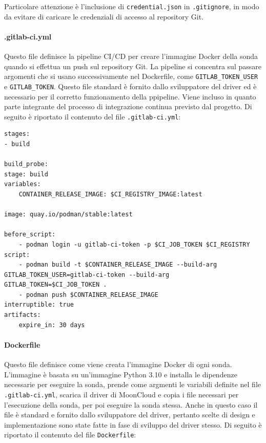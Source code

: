 Particolare attenzione è l'inclusione di \texttt{credential.json} in \texttt{.gitignore}, in modo da evitare di caricare le credenziali di accesso al repository Git. 

\paragraph{.gitlab-ci.yml} Questo file definisce la pipeline CI/CD per creare l'immagine Docker della sonda quando si effettua un push sul repository Git. La pipeline si concentra sul passare argomenti che si usano successivamente nel Dockerfile, come \texttt{GITLAB\_TOKEN\_USER} e \texttt{GITLAB\_TOKEN}. Questo file standard è fornito dallo sviluppatore del driver ed è necessario per il corretto funzionamento della ppipeline. Viene incluso in quanto parte integrante del processo di integrazione continua previsto dal progetto. Di seguito è riportato il contenuto del file \texttt{.gitlab-ci.yml}:

\begin{lstlisting}[style=mygitlabci, caption={File \texttt{.gitlab-ci.yml} per la definizione della pipeline CI/CD}]
stages:
- build

build_probe:
stage: build
variables:
    CONTAINER_RELEASE_IMAGE: $CI_REGISTRY_IMAGE:latest

image: quay.io/podman/stable:latest

before_script:
    - podman login -u gitlab-ci-token -p $CI_JOB_TOKEN $CI_REGISTRY
script:
    - podman build -t $CONTAINER_RELEASE_IMAGE --build-arg GITLAB_TOKEN_USER=gitlab-ci-token --build-arg GITLAB_TOKEN=$CI_JOB_TOKEN .
    - podman push $CONTAINER_RELEASE_IMAGE
interruptible: true
artifacts:
    expire_in: 30 days
\end{lstlisting}

\paragraph{Dockerfile} Questo file definisce come viene creata l'immagine Docker di ogni sonda. L'immagine è basata su un'immagine Python 3.10 e installa le dipendenze necessarie per eseguire la sonda, prende come argmenti le variabili definite nel file \texttt{.gitlab-ci.yml}, scarica il driver di MoonCloud e copia i file necessari per l'esecuzione della sonda, per poi eseguire la sonda stessa. Anche in questo caso il file è standard e fornito dallo sviluppatore del driver, pertanto scelte di design e implementazione sono state fatte in fase di sviluppo del driver stesso. Di seguito è riportato il contenuto del file \texttt{Dockerfile}:

